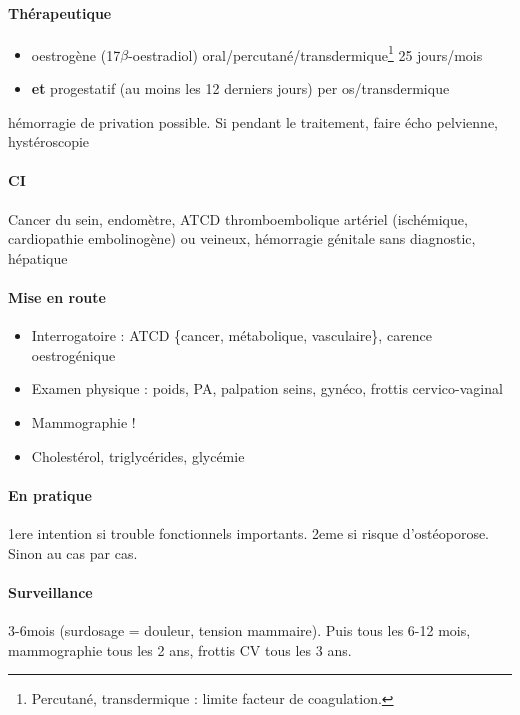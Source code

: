 \documentclass{book}
\begin{document}
\paragraph{Thérapeutique}
\label{sec:orgfe1b677}
\begin{itemize}
\item oestrogène (17\(\beta\)-oestradiol) oral/percutané/transdermique\footnote{Percutané, transdermique : limite \inc facteur de coagulation.} 25 jours/mois
\item \textbf{et} progestatif (au moins les 12 derniers jours) per os/transdermique
\end{itemize}
\danger hémorragie de privation possible. Si pendant le traitement, faire écho
pelvienne, hystéroscopie

\paragraph{CI}
\label{sec:org9c7876f}
Cancer du sein, endomètre, ATCD thromboembolique artériel (ischémique,
cardiopathie embolinogène) ou veineux, hémorragie génitale sans diagnostic, hépatique

\paragraph{Mise en route}
\label{sec:orga9eac9a}
\begin{itemize}
\item Interrogatoire : ATCD \{cancer, métabolique, vasculaire\}, carence oestrogénique
\item Examen physique : poids, PA, palpation seins, gynéco, frottis cervico-vaginal
\item Mammographie !
\item Cholestérol, triglycérides, glycémie
\end{itemize}

\paragraph{En pratique}
\label{sec:org3248795}
1ere intention si trouble fonctionnels importants. 2eme si risque
d'ostéoporose. Sinon au cas par cas.

\paragraph{Surveillance}
\label{sec:org262223c}
3-6mois (surdosage = douleur, tension mammaire). Puis tous les 6-12 mois,
mammographie tous les 2 ans, frottis CV tous les 3 ans.
\end{document}
